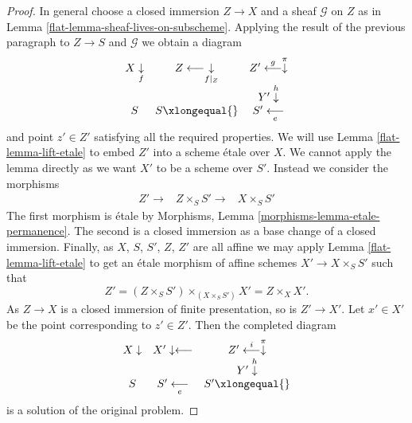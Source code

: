 \begin{proof}
\medskip\noindent
In general choose a closed immersion $Z \to X$ and a sheaf
$\mathcal{G}$ on $Z$ as in
Lemma \ref{flat-lemma-sheaf-lives-on-subscheme}.
Applying the result of the previous paragraph to $Z \to S$ and
$\mathcal{G}$ we obtain a diagram
$$
\begin{array}{ccc}X \underset{f}{\downarrow} & Z \longleftarrow\underset{f|_Z}{\downarrow} & Z' \overset{g}{\longleftarrow}\overset{\pi}{\downarrow} \\  &  & Y' \overset{h}{\downarrow} \\ S & S \xlongequal{} & S' \underset{e}{\longleftarrow}\end{array}
$$
and point $z' \in Z'$ satisfying all the required properties.
We will use
Lemma \ref{flat-lemma-lift-etale}
to embed $Z'$ into a scheme \'etale over $X$. We cannot apply the lemma directly
as we want $X'$ to be a scheme over $S'$. Instead we
consider the morphisms
$$
\begin{array}{ccc}Z' \longrightarrow & Z \times_S S' \longrightarrow & X \times_S S'\end{array}
$$
The first morphism is \'etale by
Morphisms, Lemma \ref{morphisms-lemma-etale-permanence}.
The second is a closed immersion as a base change of a closed immersion.
Finally, as $X$, $S$, $S'$, $Z$, $Z'$ are all affine we may apply
Lemma \ref{flat-lemma-lift-etale}
to get an \'etale morphism of affine schemes $X' \to X \times_S S'$ such that
$$
Z' = (Z \times_S S') \times_{(X \times_S S')} X' = Z \times_X X'.
$$
As $Z \to X$ is a closed immersion of finite presentation, so is $Z' \to X'$.
Let $x' \in X'$ be the point corresponding to $z' \in Z'$.
Then the completed diagram
$$
\begin{array}{ccc}X \downarrow & X' \downarrow\longleftarrow & Z' \overset{i}{\longleftarrow}\overset{\pi}{\downarrow} \\  &  & Y' \overset{h}{\downarrow} \\ S & S' \underset{e}{\longleftarrow} & S' \xlongequal{}\end{array}
$$
is a solution of the original problem.
\end{proof}

